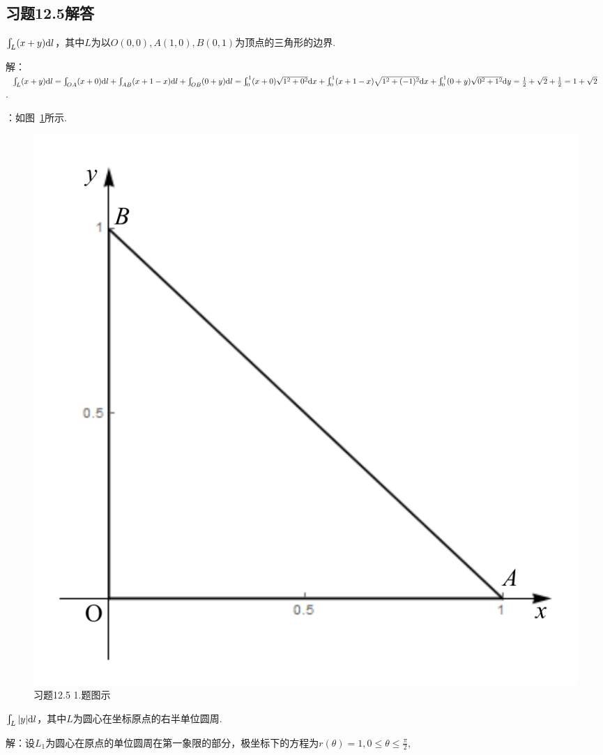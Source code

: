 \documentclass[12pt,UTF8]{ctexart}
\newcommand{\Int}[4]{\varint\nolimits_{#1}^{#2}#3\mathrm d#4}
\newcommand{\LInt}[3]{\varint\nolimits_{#1}#2\mathrm d#3}
\begin{document}
\subsection{习题12.5解答}
\begin{enumerate}
$\LInt{L}{(x+y)}{l}$，其中$L$为以$O(0,0),A(1,0),B(0,1)$为顶点的三角形的边界.

解：$\LInt{L}{(x+y)}{l}=\LInt{OA}{(x+0)}{l}+\LInt{AB}{(x+1-x)}{l}+\LInt{OB}{(0+y)}{l}\\
=\Int01{(x+0)\sqrt{1^2+0^2}}{x}+\Int01{(x+1-x)\sqrt{1^2+(-1)^2}}{x}+\Int01{(0+y)\sqrt{0^2+1^2}}{y}\\
=\frac12+\sqrt2+\frac12=1+\sqrt2$.

{：}如图~\ref{12-5-1}所示.
\begin{figure}[H]
\begin{center}
\includegraphics[height=0.3\textheight]{Figures20/Fig12-5-1.pdf}
\end{center}
\caption{习题12.5 1.题图示}
\label{12-5-1}
\end{figure}

$\LInt L{|y|}l$，其中$L$为圆心在坐标原点的右半单位圆周.

解：设$L_1$为圆心在原点的单位圆周在第一象限的部分，极坐标下的方程为$r(\theta)=1,0\leqslant\theta\leqslant\frac\pi2$,


\end{enumerate}
\end{document}
